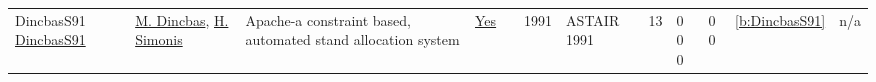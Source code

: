 {\begin{longtable}{>{\raggedright\arraybackslash}p{3cm}>{\raggedright\arraybackslash}p{4.5cm}>{\raggedright\arraybackslash}p{6.0cm}rrrp{2.5cm}rp{1cm}p{1cm}rr}
DincbasS91 \href{}{DincbasS91} & \hyperref[auth:a717]{M. Dincbas}, \hyperref[auth:a17]{H. Simonis} & Apache-a constraint based, automated stand allocation system & \href{../works/DincbasS91.pdf}{Yes} & \cite{DincbasS91} & 1991 & ASTAIR 1991 & 13 & 0 0 0 & 0 0 & \ref{b:DincbasS91} & n/a\\
\end{longtable}
}

